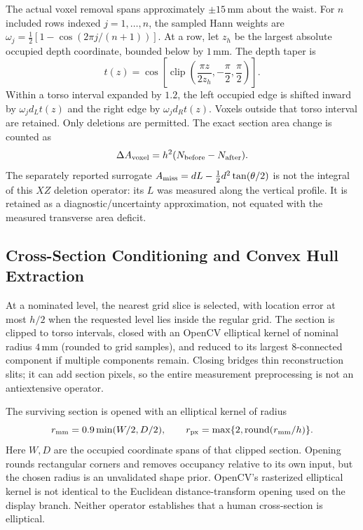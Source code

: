 \documentclass[journal]{IEEEtran}
\begin{document}
The actual voxel removal spans approximately $\pm15$\,mm about the waist. For $n$ included rows indexed $j=1,\ldots,n$, the sampled Hann weights are $\omega_j=\tfrac12[1-\cos(2\pi j/(n+1))]$. At a row, let $z_h$ be the largest absolute occupied depth coordinate, bounded below by $1$\,mm. The depth taper is
\begin{equation}
t(z)=\cos\!\left[\operatorname{clip}\left(\frac{\pi z}{2z_h},-\frac\pi2,\frac\pi2\right)\right].
\end{equation}
Within a torso interval expanded by $1.2$, the left occupied edge is shifted inward by $\omega_jd_Lt(z)$ and the right edge by $\omega_jd_Rt(z)$. Voxels outside that torso interval are retained. Only deletions are permitted. The exact section area change is counted as
\begin{equation}
\Delta A_{\rm voxel}=h^2(N_{\rm before}-N_{\rm after}).
\end{equation}
The separately reported surrogate $A_{\rm miss}=dL-\tfrac12d^2\tan(\theta/2)$ is not the integral of this $XZ$ deletion operator: its $L$ was measured along the vertical profile. It is retained as a diagnostic/uncertainty approximation, not equated with the measured transverse area deficit.

\subsection{Cross-Section Conditioning and Convex Hull Extraction}
\label{subsec:shape_regularization}
\label{subsec:girth_extraction}
At a nominated level, the nearest grid slice is selected, with location error at most $h/2$ when the requested level lies inside the regular grid. The section is clipped to torso intervals, closed with an OpenCV elliptical kernel of nominal radius $4$\,mm (rounded to grid samples), and reduced to its largest 8-connected component if multiple components remain. Closing bridges thin reconstruction slits; it can add section pixels, so the entire measurement preprocessing is not an antiextensive operator.

The surviving section is opened with an elliptical kernel of radius
\begin{equation}
r_{\rm mm}=0.9\min(W/2,D/2),\qquad
r_{\rm px}=\max\{2,\operatorname{round}(r_{\rm mm}/h)\}.
\label{eq:disk_radius}
\end{equation}
Here $W,D$ are the occupied coordinate spans of that clipped section. Opening rounds rectangular corners and removes occupancy relative to its own input, but the chosen radius is an unvalidated shape prior. OpenCV's rasterized elliptical kernel is not identical to the Euclidean distance-transform opening used on the display branch. Neither operator establishes that a human cross-section is elliptical.
\end{document}
